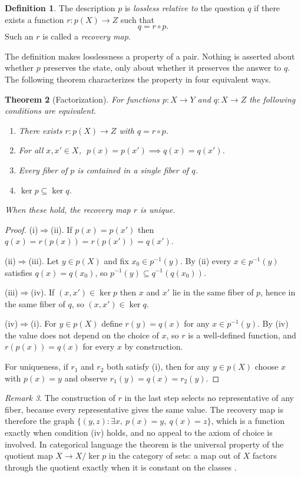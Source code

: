 \documentclass[11pt]{article}
\newtheorem{theorem}{Theorem}[section]
\theoremstyle{definition}
\newtheorem{definition}[theorem]{Definition}
\theoremstyle{remark}
\newtheorem{remark}[theorem]{Remark}
\begin{document}
\begin{definition}\label{def:lossless}
The description $p$ is \emph{lossless relative to} the question $q$ if there exists a function $r:p(X)\to Z$ such that
\[
q=r\circ p.
\]
Such an $r$ is called a \emph{recovery map}.
\end{definition}

The definition makes losslessness a property of a pair. Nothing is asserted about whether $p$ preserves the state, only about whether it preserves the answer to $q$. The following theorem characterizes the property in four equivalent ways.

\begin{theorem}[Factorization]\label{thm:factorization}
For functions $p:X\to Y$ and $q:X\to Z$ the following conditions are equivalent.
\begin{enumerate}
\item[\textup{(i)}] There exists $r:p(X)\to Z$ with $q=r\circ p$.
\item[\textup{(ii)}] For all $x,x'\in X$, $\;p(x)=p(x')\implies q(x)=q(x')$.
\item[\textup{(iii)}] Every fiber of $p$ is contained in a single fiber of $q$.
\item[\textup{(iv)}] $\ker p\subseteq\ker q$.
\end{enumerate}
When these hold, the recovery map $r$ is unique.
\end{theorem}

\begin{proof}
(i)$\Rightarrow$(ii). If $p(x)=p(x')$ then $q(x)=r(p(x))=r(p(x'))=q(x')$.

(ii)$\Rightarrow$(iii). Let $y\in p(X)$ and fix $x_0\in p^{-1}(y)$. By (ii) every $x\in p^{-1}(y)$ satisfies $q(x)=q(x_0)$, so $p^{-1}(y)\subseteq q^{-1}(q(x_0))$.

(iii)$\Rightarrow$(iv). If $(x,x')\in\ker p$ then $x$ and $x'$ lie in the same fiber of $p$, hence in the same fiber of $q$, so $(x,x')\in\ker q$.

(iv)$\Rightarrow$(i). For $y\in p(X)$ define $r(y)=q(x)$ for any $x\in p^{-1}(y)$. By (iv) the value does not depend on the choice of $x$, so $r$ is a well-defined function, and $r(p(x))=q(x)$ for every $x$ by construction.

For uniqueness, if $r_1$ and $r_2$ both satisfy (i), then for any $y\in p(X)$ choose $x$ with $p(x)=y$ and observe $r_1(y)=q(x)=r_2(y)$.
\end{proof}

\begin{remark}
The construction of $r$ in the last step selects no representative of any fiber, because every representative gives the same value. The recovery map is therefore the graph $\{(y,z):\exists x,\ p(x)=y,\ q(x)=z\}$, which is a function exactly when condition (iv) holds, and no appeal to the axiom of choice is involved. In categorical language the theorem is the universal property of the quotient map $X\to X/\ker p$ in the category of sets: a map out of $X$ factors through the quotient exactly when it is constant on the classes \cite{maclane}.
\end{remark}
\end{document}
